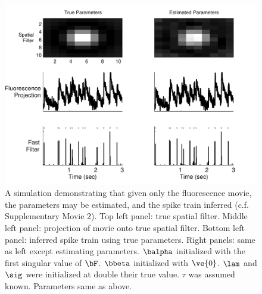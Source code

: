 \begin{figure}[H]
\centering \includegraphics[width=.9\linewidth]{../graphics/spatial_EM}
\caption{A simulation demonstrating that given only the fluorescence movie, the parameters may be estimated, and the spike train inferred (c.f. Supplementary Movie 2). Top left panel: true spatial filter.  Middle left panel: projection of movie onto true spatial filter. Bottom left panel: inferred spike train using true parameters. Right panels: same as left except estimating parameters.  $\balpha$ initialized with the first singular value of $\bF$.  $\bbeta$ initialized with $\ve{0}$.  $\lam$ and $\sig$ were initialized at double their true value.  $\tau$ was assumed known. Parameters same as above.} \label{fig:spatial_EM}
\end{figure}
